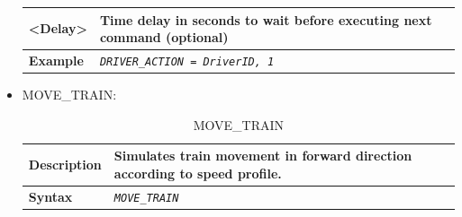 \documentclass{template/openetcs}
\begin{document}
\begin{itemize}
\begin{longtable}{|l|l|l|}
			\hline
			
				\begin{minipage}[t]{0.22\linewidth} \textbf{<Delay>} \end{minipage}
			&	\multicolumn{2}{l|}{ \begin{minipage}[t]{0.78\linewidth} Time delay in seconds to wait before executing next command (optional) \end{minipage} } \\
			
			\hline
			
				\begin{minipage}[t]{0.22\linewidth} \textbf{Example} \end{minipage}
			&	\multicolumn{2}{l|}{ \begin{minipage}[t]{0.78\linewidth} \emph{\texttt{DRIVER\_ACTION = DriverID, 1}} \end{minipage} } \\
			
			\hline \hline
			
		\end{longtable}
	
	\item MOVE\_TRAIN:
		
		\begin{longtable}{|l|l|}
		\caption{MOVE\_TRAIN}\\  
								
			\hline						
				
				\begin{minipage}[t]{0.22\linewidth} \textbf{Description} \end{minipage} 
			&	\begin{minipage}[t]{0.78\linewidth} Simulates train movement in forward direction according to speed profile. \end{minipage} \\
						
			\hline
									
				\begin{minipage}[t]{0.22\linewidth} \textbf{Syntax} \end{minipage}
			&	\begin{minipage}[t]{0.78\linewidth} \emph{\texttt{MOVE\_TRAIN}} \end{minipage} \\ 
			
			\hline \hline
			
		\end{longtable}
		

\end{itemize}
\end{document}
